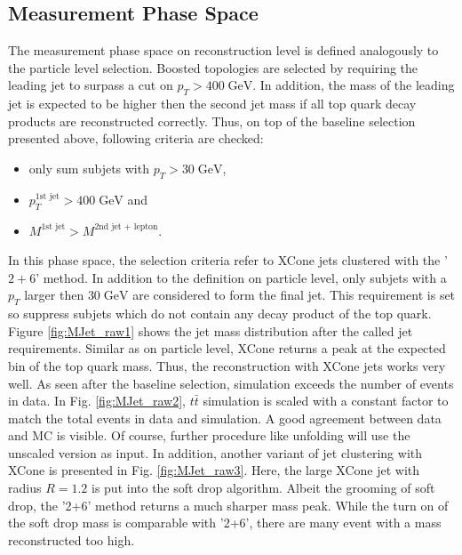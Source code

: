 \subsection{Measurement Phase Space}
\label{sec:FinalSel}
	The measurement phase space on reconstruction level is defined analogously to the particle level selection. Boosted topologies are selected by requiring the leading jet to surpass a cut on $p_T > 400\;\text{GeV}$. In addition, the mass of the leading jet is expected to be higher then the second jet mass if all top quark decay products are reconstructed correctly. Thus, on top of the baseline selection presented above, following criteria are checked:
	\begin{itemize}
	\item only sum subjets with $p_T > 30\;\text{GeV}$,
	\item $p_T^{\text{1st jet}} > 400\;\text{GeV}$ and
	\item $M^{\text{1st jet}} > M^{\text{2nd jet + lepton}}$.
	\end{itemize}
	In this phase space, the selection criteria refer to XCone jets clustered with the '$2+6$' method.	In addition to the definition on particle level, only subjets with a $p_T$ larger then $30\;\text{GeV}$ are considered to form the final jet. This requirement is set so suppress subjets which do not contain any decay product of the top quark. Figure \ref{fig:MJet_raw1} shows the jet mass distribution after the called jet requirements. Similar as on particle level, XCone returns a peak at the expected bin of the top quark mass. Thus, the reconstruction with XCone jets works very well. As seen after the baseline selection, simulation exceeds the number of events in data. In Fig. \ref{fig:MJet_raw2}, $t\bar{t}$ simulation is scaled with a constant factor to match the total events in data and simulation. A good agreement between data and MC is visible. Of course, further procedure like unfolding will use the unscaled version as input. In addition, another variant of jet clustering with XCone is presented in Fig. \ref{fig:MJet_raw3}. Here, the large XCone jet with radius $R=1.2$ is put into the soft drop algorithm. Albeit the grooming of soft drop, the '2+6' method returns a much sharper mass peak. While the turn on of the soft drop mass is comparable with '2+6', there are many event with a mass reconstructed too high.

